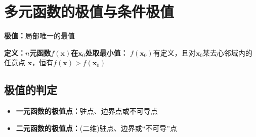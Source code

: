 \section{多元函数的极值与条件极值}

{\bf 极值：}局部唯一的最值

{\bf 定义：}{\bf $n$元函数$f(\bm{x})$在$\bm{x}_0$处取最小值：}
$f(\bm{x}_0)$有定义，且对$\bm{x}_0$某去心邻域内的任意点
$\bm{x}$，恒有$f(\bm{x})>f(\bm{x}_0)$

\begin{center}
	
\end{center}

\subsection{极值的判定}

\begin{itemize}
  \item {\bf 一元函数的极值点：}驻点、边界点或不可导点 
  \item {\bf 二元函数的极值点：}(二维)驻点、边界或“不可导”点 
\end{itemize}

